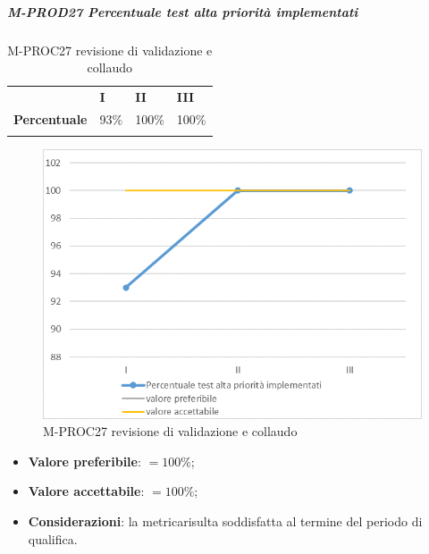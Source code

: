 \subparagraph{M-PROD27 Percentuale test alta priorità implementati} \mbox{}
\begin{longtable}[H!] {						
		>{}p{50mm}  		
		>{}p{8mm}
		>{}p{8mm}		
		>{}p{8mm}		
	}
	\rowcolor{gray!50}
	\textbf{} & \textbf{I} & \textbf{II} & \textbf{III}  \TBstrut \\ [2mm]
	\textbf{Percentuale} & 93\% & 100\% & 100\%  \TBstrut \\ [2mm]
	\rowcolor{white}
	\caption{M-PROC27 revisione di validazione e collaudo}
\end{longtable}
\begin{figure}[H] 	
	\includegraphics[width=\linewidth]{./img/grafici/RA27.png}	
	\caption{M-PROC27 revisione di validazione e collaudo}	
\end{figure}
\begin{itemize}
	\item \textbf{Valore preferibile}: $= 100\%$;
	\item \textbf{Valore accettabile}: $= 100\%$;
	\item \textbf{Considerazioni}: la metrica\glosp risulta soddisfatta al termine del periodo di qualifica.
\end{itemize}

